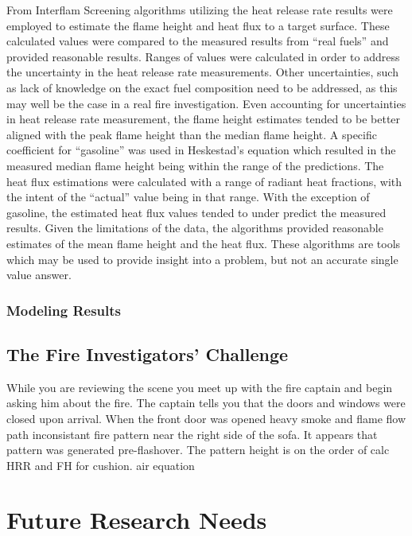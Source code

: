\documentclass[twoside]{uocthesis}
\begin{document}
{From Interflam  Screening algorithms utilizing the heat release rate results were employed to estimate the flame height and heat flux to a target surface.  These calculated values were compared to the measured results from “real fuels” and provided reasonable results.  Ranges of values were calculated in order to address the uncertainty in the heat release rate measurements.  Other uncertainties, such as lack of knowledge on the exact fuel composition need to be addressed, as this may well be the case in a real fire investigation.  Even accounting for uncertainties in heat release rate measurement, the flame height estimates tended to be better aligned with the peak flame height than the median flame height.  A specific coefficient for “gasoline” was used in Heskestad’s equation which resulted in the measured median flame height being within the range of the predictions.  The heat flux estimations were calculated with a range of radiant heat fractions, with the intent of the “actual” value being in that range.  With the exception of gasoline, the estimated heat flux values tended to under predict the measured results.  Given the limitations of the data, the algorithms provided reasonable estimates of the mean flame height and the heat flux.  These algorithms are tools which may be used to provide insight into a problem, but not an accurate single value answer. 

\subsection{Modeling Results}




\section{The Fire Investigators' Challenge}

While you are reviewing the scene you meet up with the fire captain and begin asking him about the fire.  The captain tells you that the doors and windows were closed upon arrival.  When the front door was opened heavy smoke and flame 
flow path
inconsistant fire pattern near the right side of the sofa.  It appears that pattern was generated pre-flashover.  The pattern height is on the order of   calc HRR and FH for cushion.
air equation

\chapter{Future Research Needs}



}
\end{document}
